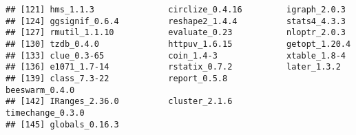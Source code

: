 \documentclass[
]{article}
\begin{document}
\begin{verbatim}
## [121] hms_1.1.3               circlize_0.4.16         igraph_2.0.3           
## [124] ggsignif_0.6.4          reshape2_1.4.4          stats4_4.3.3           
## [127] rmutil_1.1.10           evaluate_0.23           nloptr_2.0.3           
## [130] tzdb_0.4.0              httpuv_1.6.15           getopt_1.20.4          
## [133] clue_0.3-65             coin_1.4-3              xtable_1.8-4           
## [136] e1071_1.7-14            rstatix_0.7.2           later_1.3.2            
## [139] class_7.3-22            report_0.5.8            beeswarm_0.4.0         
## [142] IRanges_2.36.0          cluster_2.1.6           timechange_0.3.0       
## [145] globals_0.16.3
\end{verbatim}
\end{document}
